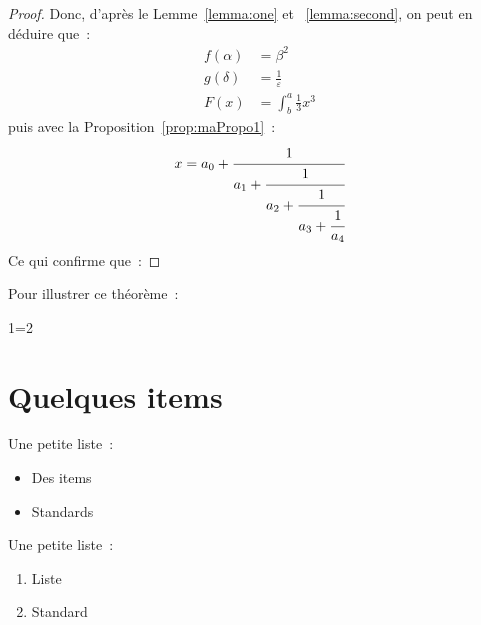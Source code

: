 \begin{proof}
Donc, d'après le Lemme~\ref{lemma:one} et ~\ref{lemma:second}, on peut en déduire que~:
\begin{align*}
  f(\alpha) &= \beta^2\\
  g(\delta) &= \frac{1}{\varepsilon}\\
  F(x) &= \int^a_b \frac{1}{3}x^3
\end{align*}
puis avec la Proposition~\ref{prop:maPropo1}~:
\begin{equation}
  x = a_0 + \cfrac{1}{a_1 
          + \cfrac{1}{a_2 
          + \cfrac{1}{a_3 + \cfrac{1}{a_4} } } }
\end{equation}
Ce qui confirme que~:

\end{proof}


\noindent Pour illustrer ce théorème~:
\begin{example}
1=2
\end{example}

\section{Quelques items}


\noindent Une petite liste~:
\begin{itemize}
\item Des items
\item Standards
\end{itemize}

\noindent Une petite liste~:
\begin{enumerate}
\item Liste
\item Standard
\end{enumerate}

